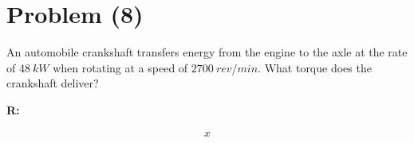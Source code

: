 \section{Problem (8)}
	An automobile crankshaft transfers energy from the engine to the axle at the rate of $48 \ kW$ when rotating at a speed of $2700 \ rev/min$. What torque does the crankshaft deliver?

	\textbf{R:}

	\begin{align}
		x
	\end{align}
